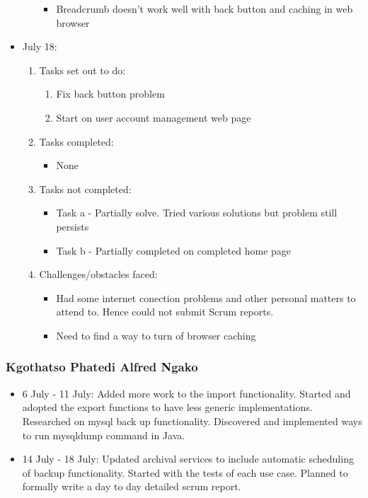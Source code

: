 \begin{itemize}
\begin{enumerate}
\begin{itemize}
			\item Breadcrumb doesn't work well with back button and caching in web browser
		\end{itemize}			
	\end{enumerate}
	\item July 18:
	\begin{enumerate}
		\item Tasks set out to do:
		\begin{enumerate}
			\item Fix back button problem
			\item Start on user account management web page			
		\end{enumerate}
		\item Tasks completed:
		\begin{itemize}
			\item None								
		\end{itemize}
			\item Tasks not completed:
		\begin{itemize}
			\item Task a - Partially solve. Tried various solutions but problem still persists
			\item Task b - Partially completed on completed home page
		\end{itemize}
		\item Challenges/obstacles faced:
		\begin{itemize}
			\item Had some internet conection problems and other personal matters to attend to. Hence could not submit Scrum reports.
			\item Need to find a way to turn of browser caching
		\end{itemize}			
	\end{enumerate}
\end{itemize}

\subsubsection{Kgothatso Phatedi Alfred Ngako}
\begin{itemize}	
	\item 6 July - 11 July: Added more work to the import functionality. Started and adopted the export functions to have less generic implementations. Researched on mysql back up functionality. Discovered and implemented ways to run mysqldump command in Java.
	\item 14  July - 18 July: Updated archival services to include automatic scheduling of backup functionality. Started with the tests of each use case. Planned to formally write a day to day detailed scrum report.
\end{itemize}
